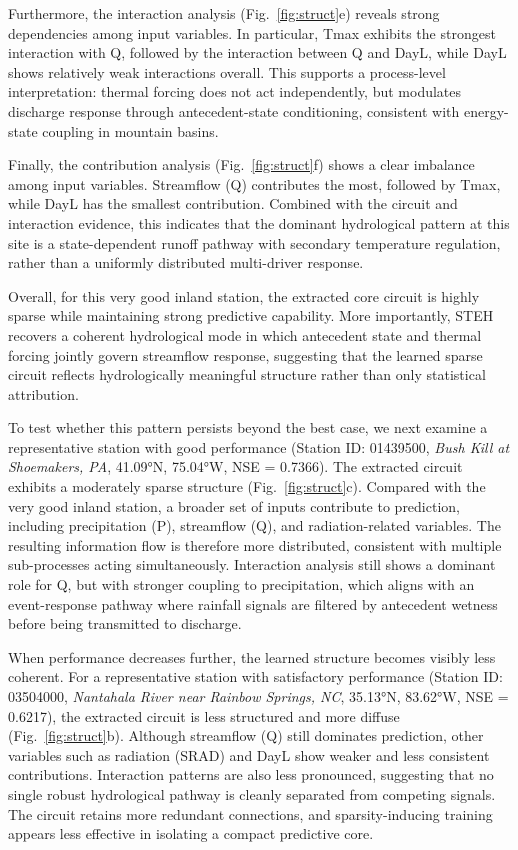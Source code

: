Furthermore, the interaction analysis (Fig.~\ref{fig:struct}e) reveals strong dependencies among input variables. In particular, Tmax exhibits the strongest interaction with Q, followed by the interaction between Q and DayL, while DayL shows relatively weak interactions overall. This supports a process-level interpretation: thermal forcing does not act independently, but modulates discharge response through antecedent-state conditioning, consistent with energy-state coupling in mountain basins\cite{WRR_shap}.

Finally, the contribution analysis (Fig.~\ref{fig:struct}f) shows a clear imbalance among input variables. Streamflow (Q) contributes the most, followed by Tmax, while DayL has the smallest contribution. Combined with the circuit and interaction evidence, this indicates that the dominant hydrological pattern at this site is a state-dependent runoff pathway with secondary temperature regulation, rather than a uniformly distributed multi-driver response.

Overall, for this very good inland station, the extracted core circuit is highly sparse while maintaining strong predictive capability\cite{7552539}. More importantly, STEH recovers a coherent hydrological mode in which antecedent state and thermal forcing jointly govern streamflow response, suggesting that the learned sparse circuit reflects hydrologically meaningful structure rather than only statistical attribution.

To test whether this pattern persists beyond the best case, we next examine a representative station with good performance (Station ID: 01439500, \textit{Bush Kill at Shoemakers, PA}, 41.09°N, 75.04°W, NSE = 0.7366). The extracted circuit exhibits a moderately sparse structure (Fig.~\ref{fig:struct}c). Compared with the very good inland station, a broader set of inputs contribute to prediction, including precipitation (P), streamflow (Q), and radiation-related variables. The resulting information flow is therefore more distributed\cite{wang2022interpretabilitywildcircuitindirect}, consistent with multiple sub-processes acting simultaneously. Interaction analysis still shows a dominant role for Q, but with stronger coupling to precipitation, which aligns with an event-response pathway where rainfall signals are filtered by antecedent wetness before being transmitted to discharge\cite{BURN2023129075}.

\FloatBarrier
When performance decreases further, the learned structure becomes visibly less coherent. For a representative station with satisfactory performance (Station ID: 03504000, \textit{Nantahala River near Rainbow Springs, NC}, 35.13°N, 83.62°W, NSE = 0.6217), the extracted circuit is less structured and more diffuse (Fig.~\ref{fig:struct}b). Although streamflow (Q) still dominates prediction, other variables such as radiation (SRAD) and DayL show weaker and less consistent contributions. Interaction patterns are also less pronounced, suggesting that no single robust hydrological pathway is cleanly separated from competing signals. The circuit retains more redundant connections, and sparsity-inducing training appears less effective in isolating a compact predictive core\cite{openai_weight_sparse_transformers}.


